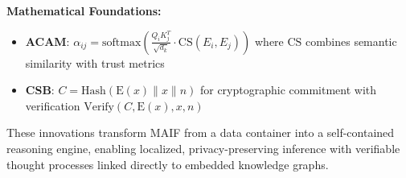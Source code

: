 \documentclass[conference]{IEEEtran}
\begin{document}

\textbf{Mathematical Foundations:}
\begin{itemize}[leftmargin=*]
\item \textbf{ACAM}: $\alpha_{ij} = \text{softmax}\left(\frac{Q_i K_j^T}{\sqrt{d_k}} \cdot \text{CS}(E_i, E_j)\right)$ where $\text{CS}$ combines semantic similarity with trust metrics
\item \textbf{CSB}: $C = \text{Hash}(\text{E}(x) \| x \| n)$ for cryptographic commitment with verification $\text{Verify}(C, \text{E}(x), x, n)$
\end{itemize}

These innovations transform MAIF from a data container into a self-contained reasoning engine, enabling localized, privacy-preserving inference with verifiable thought processes linked directly to embedded knowledge graphs.

% 
\end{document}
